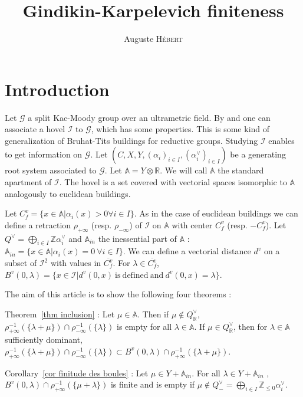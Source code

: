 \documentclass[12pt]{article}
\date{}
\title{Gindikin-Karpelevich finiteness}
\author{Auguste \textsc{Hébert}}
\theoremstyle{plain}
\theoremstyle{definition}
\newcommand{\R}{\mathbb{R}}
\newcommand{\A}{\mathbb{A}}
\newcommand{\Z}{\mathbb{Z}}
\newcommand{\I}{\mathcal{I}}
\begin{document}
\maketitle


\section{Introduction}

Let $\mathcal{G}$ a split Kac-Moody group over an ultrametric field. By \cite{gaussent2008kac} and \cite{rousseau2012almost} one can associate a hovel $\I$ to $\mathcal{G}$, which has some properties. This is some kind of generalization of Bruhat-Tits buildings for reductive groups. Studying $\I$ enables to get information on $\mathcal{G}$. Let $(C,X,Y,(\alpha_i)_{i\in I},(\alpha_i^\vee)_{i\in I})$ be a generating root system associated to $\mathcal{G}$.  Let $\A=Y\otimes \R$. We will call $\A$ the standard apartment of $\I$. The hovel is a set covered with vectorial spaces isomorphic to $\A$ analogously to euclidean buildings.

Let $C_f^v=\{x\in \A|\alpha_i(x)>0\forall i\in I\}$. As in the case of euclidean buildings we can define a retraction $\rho_{+\infty}$ (resp. $\rho_{-\infty}$) of $\I$ on $\A$ with center $C_f^v$ (resp. $-C_f^v$). Let $Q^\vee=\bigoplus_{i\in I} \Z \alpha_i^\vee$ and $\A_{in}$ the inessential part of $\A$ : $\A_{in}=\{x\in \A |\alpha_i(x)=0\ \forall i\in I\}$. We can define a vectorial distance $d^v$ on a subset of $\I^2$ with values in $\overline{C_f^v}$. For $\lambda\in \overline{C_f^v}$, $B^v(0,\lambda)=\{x\in\I|d^v(0,x)\mathrm{\ is\ defined\ and\ }d^v(0,x)=\lambda\}$.

\vspace{3mm}
 The aim of this article is to show the following four theorems : 
\vspace{3mm}

Theorem~\ref{thm inclusion} :
Let $\mu\in \A$. Then if $\mu\notin Q_{\R}^\vee$, $\rho_{+\infty}^{-1}(\{\lambda+\mu\})\cap \rho_{-\infty}^{-1}(\{\lambda\})$ is empty for all $\lambda\in \A$. If $\mu\in Q^\vee_{\R}$, then for $\lambda\in \A$ sufficiently dominant, $\rho_{+\infty}^{-1}(\{\lambda+\mu\})\cap \rho_{-\infty}^{-1}(\{\lambda\})\subset B^v(0,\lambda)\cap \rho_{+\infty}^{-1}(\{\lambda+\mu\}) $. 

\vspace{3mm}
Corollary~\ref{cor finitude des boules} :
 Let $\mu\in Y+\A_{in}$. For all $\lambda\in Y+\A_{in}$ , $B^v(0,\lambda)\cap \rho_{+\infty}^{-1}(\{\mu+\lambda\})$ is finite and is empty if $\mu\notin Q^\vee_-=\bigoplus _{i\in I}\Z_{\leq 0}\alpha_i^\vee$.
\end{document}
